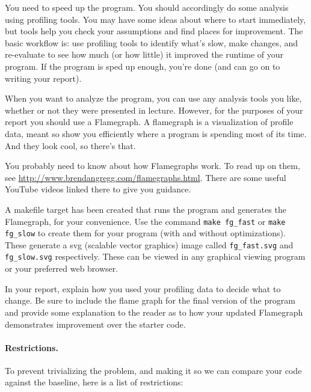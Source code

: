 \documentclass[letterpaper,10pt]{article}
\begin{document}
You need to speed up the program. You should accordingly do some analysis using profiling tools. You may have some ideas about where to start immediately, but tools help you check your assumptions and find places for improvement. The basic workflow is: use profiling tools to identify what's slow, make changes, and re-evaluate to see how much (or how little) it improved the runtime of your program. If the program is sped up enough, you're done (and can go on to writing your report).

When you want to analyze the program, you can use any analysis tools you like, whether or not they were presented in lecture. However, for the purposes of your report you should use a Flamegraph. A flamegraph is a visualization of profile data, meant so show you efficiently where a program is spending most of its time. And they look cool, so there's that.

You probably need to know about how Flamegraphs work. To read up on them, see \url{http://www.brendangregg.com/flamegraphs.html}. There are some useful YouTube videos linked there to give you guidance.

A makefile target has been created that runs the program and generates the Flamegraph, for your convenience. Use the command \texttt{make fg\_fast} or \texttt{make fg\_slow} to create them for your program (with and without optimizations). These generate a svg (scalable vector graphics) image called \texttt{fg\_fast.svg} and \texttt{fg\_slow.svg} respectively. These can be viewed in any graphical viewing program or your preferred web browser.

In your report, explain how you used your profiling data to decide what to change. Be sure to include the flame graph for the final version of the program and provide some explanation to the reader as to how your updated Flamegraph demonstrates improvement over the starter code.

\paragraph{Restrictions.}

To prevent trivializing the problem, and making it so we can compare your code against the baseline, here is a list of restrictions:
\end{document}
